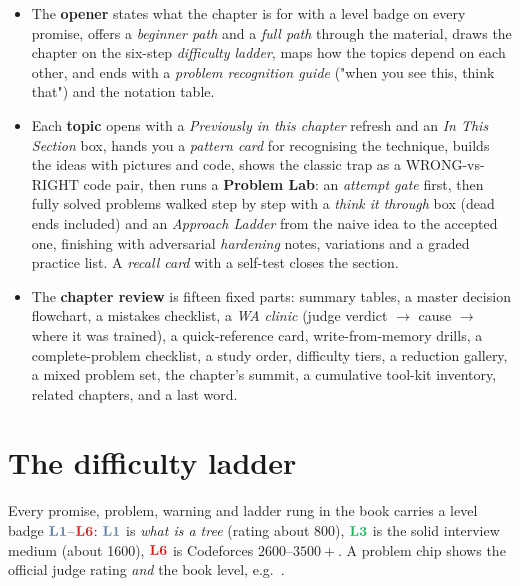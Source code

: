 \begin{itemize}
  \item The \textbf{opener} states what the chapter is for with a level badge on
        every promise, offers a \emph{beginner path} and a \emph{full path} through
        the material, draws the chapter on the six-step \emph{difficulty ladder},
        maps how the topics depend on each other, and ends with a
        \emph{problem recognition guide} ("when you see this, think that") and
        the notation table.
  \item Each \textbf{topic} opens with a \emph{Previously in this chapter} refresh
        and an \emph{In This Section} box, hands you a \emph{pattern card} for
        recognising the technique, builds the ideas with pictures and code, shows
        the classic trap as a WRONG-vs-RIGHT code pair, then runs a \textbf{Problem
        Lab}: an \emph{attempt gate} first, then fully solved problems walked step
        by step with a \emph{think it through} box (dead ends included) and an
        \emph{Approach Ladder} from the naive idea to the accepted one, finishing
        with adversarial \emph{hardening} notes, variations and a graded practice
        list. A \emph{recall card} with a self-test closes the section.
  \item The \textbf{chapter review} is fifteen fixed parts: summary tables, a
        master decision flowchart, a mistakes checklist, a \emph{WA clinic}
        (judge verdict $\to$ cause $\to$ where it was trained), a quick-reference
        card, write-from-memory drills, a complete-problem checklist, a study
        order, difficulty tiers, a reduction gallery, a mixed problem set, the
        chapter's summit, a cumulative tool-kit inventory, related chapters, and
        a last word.
\end{itemize}

\section*{The difficulty ladder}

Every promise, problem, warning and ladder rung in the book carries a level
badge $\lv1$--$\lv6$: $\lv1$ is \emph{what is a tree} (rating about 800),
$\lv3$ is the solid interview medium (about 1600), $\lv6$ is Codeforces
$2600$--$3500{+}$. A problem chip shows the official judge rating \emph{and}
the book level, e.g.\ .

